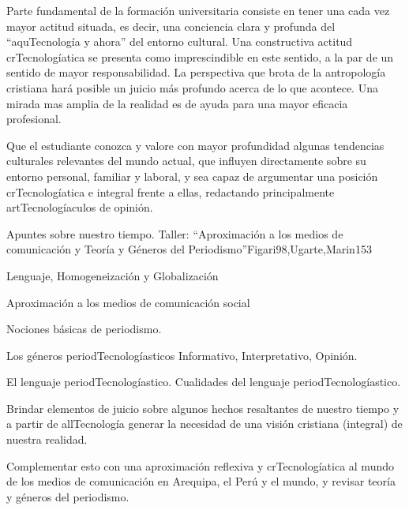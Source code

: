 \begin{syllabus}


\begin{justification}
Parte fundamental de la formación universitaria consiste en tener una cada vez mayor actitud situada, es decir, una conciencia clara y profunda del ``aquTecnología y ahora'' del entorno cultural.  Una constructiva actitud crTecnologíatica se presenta como imprescindible en este sentido, a la par de un sentido de mayor responsabilidad.  La perspectiva que brota de la antropología cristiana hará posible un juicio más profundo acerca de lo que acontece.  Una mirada mas amplia de la realidad es de ayuda para una mayor eficacia profesional.
\end{justification}

\begin{goals}
\item Que el estudiante conozca y valore con mayor profundidad algunas tendencias culturales relevantes del mundo actual, que influyen directamente sobre su entorno personal, familiar y laboral, y sea capaz de argumentar una posición crTecnologíatica e integral frente a ellas, redactando principalmente artTecnologíaculos de opinión.
\end{goals}

\begin{outcomes}
\end{outcomes}

\begin{unit}{Apuntes sobre nuestro tiempo. Taller: ``Aproximación a los medios de comunicación y Teoría y Géneros del Periodismo''}{Figari98,Ugarte,Marin}{15}{3}
\begin{topics}
	\item Lenguaje, Homogeneización y Globalización
	\item Aproximación a los medios de comunicación social
	\item Nociones básicas de periodismo.
	\item Los géneros periodTecnologíasticos Informativo, Interpretativo, Opinión.
	\item El lenguaje periodTecnologíastico. Cualidades del lenguaje periodTecnologíastico.
\end{topics}
\begin{unitgoals}
	\item Brindar elementos de juicio sobre algunos hechos resaltantes de nuestro tiempo y a partir de allTecnología generar la necesidad de una visión cristiana (integral) de nuestra realidad. 	
	\item Complementar esto con una aproximación reflexiva y crTecnologíatica al mundo de los medios de comunicación en Arequipa, el Perú y el mundo, y revisar teoría y géneros del periodismo.
\end{unitgoals}
\end{unit}


\end{syllabus}
